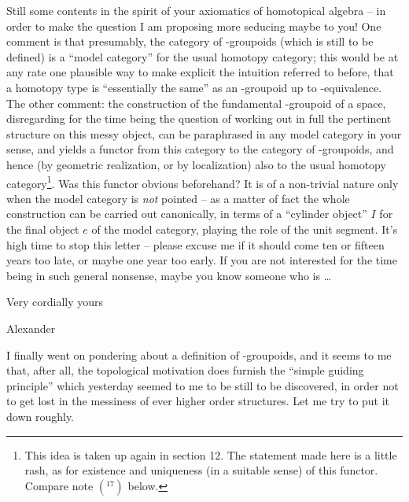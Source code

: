 Still some contents in the spirit of your axiomatics of homotopical
algebra -- in order to make the question I am proposing more seducing
maybe to you! One comment is that presumably, the category of
\oo-groupoids (which is still to be defined) is a ``model category''
for the usual homotopy category; this would be at any rate one
plausible way to make explicit the intuition referred to before, that
a homotopy type is ``essentially the same'' as an \oo-groupoid up to
\oo-equivalence. The other comment: the construction of the
fundamental \oo-groupoid of a space, disregarding for the time being
the question of working out in full the pertinent structure on this
messy object, can be paraphrased in any model category in your sense,
and yields a functor from this category to the category of
\oo-groupoids, and hence (by geometric realization, or by
localization) also to the usual homotopy category\footnote{This idea is taken up again in section 12. The statement made here is a little rash, as for existence and uniqueness (in a suitable sense) of this functor. Compare note $(^{17})$ below.}. Was this functor
obvious beforehand? It is of a non-trivial nature only when the model
category is \emph{not} pointed -- as a matter of fact the whole
construction can be carried out canonically, in terms of a ``cylinder
object'' $I$ for the final object $e$ of the model category, playing
the role of the unit segment.
It's high time to stop this letter -- please excuse me if it should
come ten or fifteen years too late, or maybe one year too early. If
you are not interested for the time being in such general nonsense,
maybe you know someone who is \ldots

\bigskip

Very cordially yours

\bigskip

\hfill Alexander

\newpage

\presectionfill{}\par

I finally went on pondering about a definition of
\oo-groupoids, and it seems to me that, after all, the topological
motivation does furnish the ``simple guiding principle'' which
yesterday seemed to me to be still to be discovered, in order not to
get lost in the messiness of ever higher order structures. Let me try
to put it down roughly.

